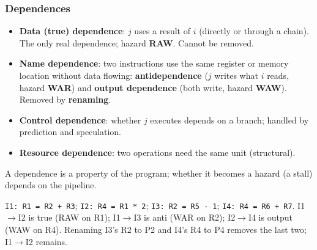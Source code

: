 \subsubsection{Dependences}
\begin{definition}
\begin{itemize}
  \item \textbf{Data (true) dependence}: $j$ uses a result of $i$ (directly or through
  a chain). The only real dependence; hazard \textbf{RAW}. Cannot be removed.
  \item \textbf{Name dependence}: two instructions use the same register or memory
  location without data flowing: \textbf{antidependence} ($j$ writes what $i$
  reads, hazard \textbf{WAR}) and \textbf{output dependence} (both write, hazard
  \textbf{WAW}). Removed by \textbf{renaming}.
  \item \textbf{Control dependence}: whether $j$ executes depends on a branch;
  handled by prediction and speculation.
  \item \textbf{Resource dependence}: two operations need the same unit (structural).
\end{itemize}
A dependence is a property of the program; whether it becomes a hazard (a stall)
depends on the pipeline.
\end{definition}

\begin{eg}
\texttt{I1: R1 = R2 + R3}; \texttt{I2: R4 = R1 * 2}; \texttt{I3: R2 = R5 - 1};
\texttt{I4: R4 = R6 + R7}. I1$\to$I2 is true (RAW on R1); I1$\to$I3 is anti (WAR on
R2); I2$\to$I4 is output (WAW on R4). Renaming I3's R2 to P2 and I4's R4 to P4
removes the last two; I1$\to$I2 remains.
\end{eg}

